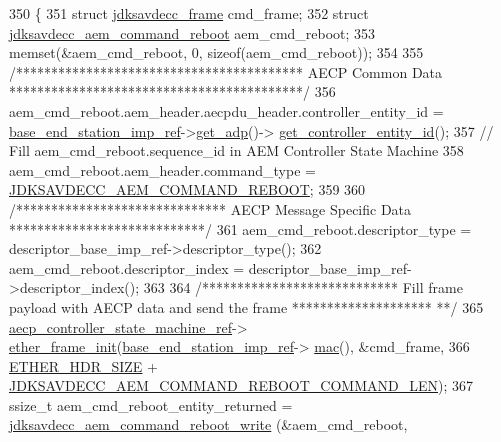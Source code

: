 \begin{DoxyCode}
350 \{
351     \textcolor{keyword}{struct }\hyperlink{structjdksavdecc__frame}{jdksavdecc\_frame} cmd\_frame;
352     \textcolor{keyword}{struct }\hyperlink{structjdksavdecc__aem__command__reboot}{jdksavdecc\_aem\_command\_reboot} aem\_cmd\_reboot;
353     memset(&aem\_cmd\_reboot, 0, \textcolor{keyword}{sizeof}(aem\_cmd\_reboot));
354 
355     \textcolor{comment}{/***************************************** AECP Common Data ******************************************/}
356     aem\_cmd\_reboot.aem\_header.aecpdu\_header.controller\_entity\_id = 
      \hyperlink{classavdecc__lib_1_1descriptor__base__imp_a550c969411f5f3b69f55cc139763d224}{base\_end\_station\_imp\_ref}->\hyperlink{classavdecc__lib_1_1end__station__imp_a471a74540ce6182fad0c17dfd010107e}{get\_adp}()->
      \hyperlink{classavdecc__lib_1_1adp_a0c0959a46658c0a22e9530334b2912da}{get\_controller\_entity\_id}();
357     \textcolor{comment}{// Fill aem\_cmd\_reboot.sequence\_id in AEM Controller State Machine}
358     aem\_cmd\_reboot.aem\_header.command\_type = \hyperlink{group__command_ga859da6235182638521da6af153bc6d3c}{JDKSAVDECC\_AEM\_COMMAND\_REBOOT};
359 
360     \textcolor{comment}{/****************************** AECP Message Specific Data ****************************/}
361     aem\_cmd\_reboot.descriptor\_type = descriptor\_base\_imp\_ref->descriptor\_type();
362     aem\_cmd\_reboot.descriptor\_index = descriptor\_base\_imp\_ref->descriptor\_index();
363 
364     \textcolor{comment}{/**************************** Fill frame payload with AECP data and send the frame ********************
      **/}
365     \hyperlink{namespaceavdecc__lib_a0b1b5aea3c0490f77cbfd9178af5be22}{aecp\_controller\_state\_machine\_ref}->
      \hyperlink{classavdecc__lib_1_1aecp__controller__state__machine_a86ff947c5e6b799cfb877d3767bfa1f9}{ether\_frame\_init}(\hyperlink{classavdecc__lib_1_1descriptor__base__imp_a550c969411f5f3b69f55cc139763d224}{base\_end\_station\_imp\_ref}->
      \hyperlink{classavdecc__lib_1_1end__station__imp_a08e1bd1861b3b8f447ea374a65ac11f9}{mac}(), &cmd\_frame,
366                                                         \hyperlink{namespaceavdecc__lib_a6c827b1a0d973e18119c5e3da518e65ca9512ad9b34302ba7048d88197e0a2dc0}{ETHER\_HDR\_SIZE} + 
      \hyperlink{group__command__reboot_gaf5f6dbe8949b2bb7db6ad9e25e8bddf1}{JDKSAVDECC\_AEM\_COMMAND\_REBOOT\_COMMAND\_LEN});
367     ssize\_t aem\_cmd\_reboot\_entity\_returned = \hyperlink{group__command__reboot_ga47e876f80dcc650ced15fa1579fece63}{jdksavdecc\_aem\_command\_reboot\_write}
      (&aem\_cmd\_reboot,

\end{DoxyCode}
